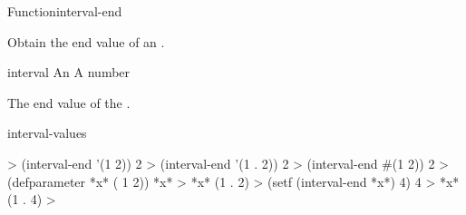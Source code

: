 \documentclass[10pt,twoside,english,pdftex]{article}
\begin{document}
\begin{functiondoc}{Function}{interval-end}%
  {
    }
%
%

\fnsyntax

\fnpurpose Obtain the end value of an .

\fnsetf
{}

\fnpackage {}

\fnmodule {}

\fnargs
\begin{args}{interval}
\arg[interval] An 
 A number
\end{args}

\fnreturns The end value of the .

\begin{alsos}{interval-values}
\end{alsos}

\fnexamples
%
%
\W\supp
\begin{example}
  > (interval-end '(1 2))
  2
  > (interval-end '(1 . 2))
  2
  > (interval-end #(1  2))
  2\goodpagebreak
  > (defparameter *x* ( 1 2))
  *x*
  > *x*
  (1 . 2)
  > (setf (interval-end *x*) 4)
  4
  > *x*
  (1 . 4)
  >
\end{example}

\end{functiondoc}

\end{document}
